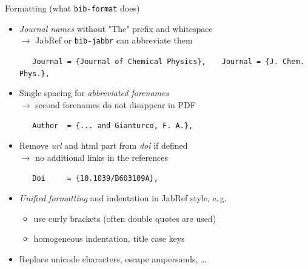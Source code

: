 \documentclass[xcolor={table,dvipsnames}]{beamer}
\renewcommand{\emph}[1]{\textit{\color{orange!90!brown}#1}}
\newcommand{\faint}{\color{black!10!gray}}
\begin{document}
\begin{frame}[fragile]{Formatting (what \texttt{bib-format} does)}
  \begin{itemize}

    \item \emph{Journal names} without "The" prefix and whitespace\\
      $\rightarrow$ JabRef or \texttt{bib-jabbr} can abbreviate them

      {\faint\verb!   Journal = {Journal of Chemical Physics},!}
      {\faint\verb!   Journal = {J. Chem. Phys.},!}

    \item Single spacing for \emph{abbreviated forenames}\\
      $\rightarrow$ second forenames do not disappear in {\small PDF}

      {\faint\verb!   Author  = {... and Gianturco, F. A.},!}

    \item Remove \emph{url} and html part from \emph{doi} if defined\\
      $\rightarrow$ no additional links in the references

      {\faint\verb!   Doi     = {10.1039/B603109A},!}

    \item \emph{Unified formatting} and indentation in  JabRef style, e.\,g.
      \begin{itemize}
        \item use curly brackets (often double quotes are used)
        \item homogeneous indentation, title case keys
      \end{itemize}

    \item Replace unicode characters, escape ampersands, \ldots

  \end{itemize}
\end{frame}
\end{document}
